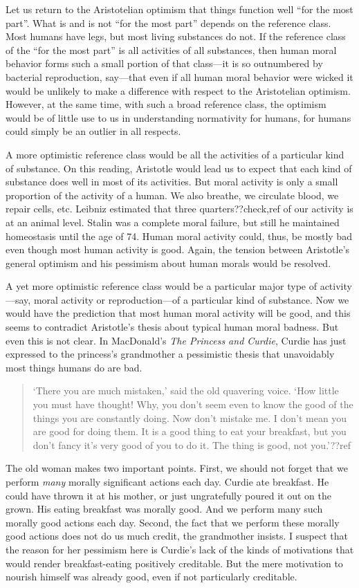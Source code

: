 Let us return to the Aristotelian optimism that things function well ``for the most part''. What is and is not
``for the most part'' depends on the reference class. Most humans have legs, but most living substances do not. 
If the reference class of the ``for the most part'' is all activities of all substances, then human moral behavior
forms such a small portion of that class---it is so outnumbered by bacterial reproduction, say---that even if 
all human moral behavior were wicked it would be unlikely to make a difference with respect to the Aristotelian
optimism. However, at the same time, with such a broad reference class, the optimism would be of little use to us
in understanding normativity for humans, for humans could simply be an outlier in all respects. 

A more optimistic reference class would be all the activities of a particular kind of substance. On this reading, 
Aristotle would lead us to expect that each kind of substance does well in most of its activities. But moral activity
is only a small proportion of the activity of a human. We also breathe, we circulate blood, we repair cells, etc. Leibniz 
estimated that three quarters??check,ref of our activity is at an animal level. Stalin was a complete moral failure, but
still he maintained homeostasis until the age of 74. Human moral activity could, thus, be mostly bad even though most
human activity is good. Again, the tension between Aristotle's general optimism and his pessimism about human morals
would be resolved.

A yet more optimistic reference class would be a particular major type of activity---say, moral activity or reproduction---of
a particular kind of substance. Now we would have the prediction that most human moral activity will be good, and this seems
to contradict Aristotle's thesis about typical human moral badness. But even this is not clear. In MacDonald's 
\textit{The Princess and Curdie}, Curdie has just expressed to the princess's grandmother a pessimistic thesis that 
unavoidably most things humans do are bad. 
\begin{quote}
`There you are much mistaken,' said the old quavering voice. `How little you must have thought! Why, you don't seem even to 
know the good of the things you are constantly doing. Now don't mistake me. I don't mean you are good for doing them. 
It is a good thing to eat your breakfast, but you don't fancy it's very good of you to do it. The thing is good, not you.'??ref
\end{quote}
The old woman makes two important points. First, we should not forget that we perform \textit{many} morally significant actions
each day. Curdie ate breakfast. He could have thrown it at his mother, or just ungratefully poured it out on the grown.
His eating breakfast was morally good. And we perform many such morally good actions each day. Second, the fact that we
perform these morally good actions does not do us much credit, the grandmother insists. I suspect that the reason for her
pessimism here is Curdie's lack of the kinds of motivations that would render breakfast-eating positively creditable.
But the mere motivation to nourish himself was already good, even if not particularly creditable.

